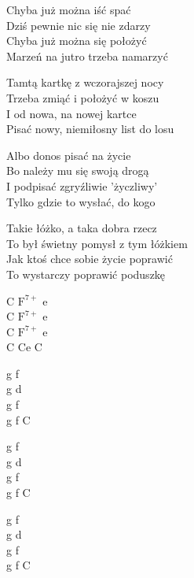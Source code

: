 \begin{text}
    \vin Chyba już można iść spać\\
    \vin Dziś pewnie nic się nie zdarzy\\
    \vin Chyba już można się położyć\\
    \vin Marzeń na jutro trzeba namarzyć

    Tamtą kartkę z wczorajszej nocy\\
    Trzeba zmiąć i położyć w koszu\\
    I od nowa, na nowej kartce\\
    Pisać nowy, niemiłosny list do losu

    Albo donos pisać na życie\\
    Bo należy mu się swoją drogą\\
    I podpisać zgryźliwie 'życzliwy'\\
    Tylko gdzie to wysłać, do kogo

    Takie łóżko, a taka dobra rzecz\\
    To był świetny pomysł z tym łóżkiem\\
    Jak ktoś chce sobie życie poprawić\\
    To wystarczy poprawić poduszkę
\end{text}
\begin{chord}
    C $\mathrm{F^{7+}}$ e\\
    C $\mathrm{F^{7+}}$ e\\
    C $\mathrm{F^{7+}}$ e\\
    C Ce C

    g f\\
    g d\\
    g f\\
    g f C

    g f\\
    g d\\
    g f\\
    g f C

    g f\\
    g d\\
    g f\\
    g f C
\end{chord}
